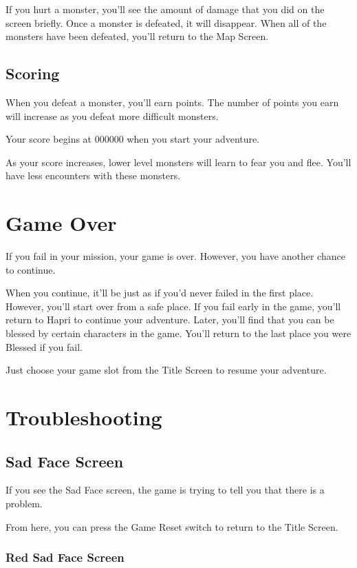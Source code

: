 \documentclass[10pt,twoside,openright]{memoir}
\begin{document}
If you hurt a monster, you'll see the amount of damage that you did on
the   screen  briefly.   Once   a  monster   is   defeated,  it   will
disappear. When all of the  monsters have been defeated, you'll return
to the Map Screen.

\section{Scoring}

When you  defeat a monster, you'll  earn points. The number  of points
you earn will increase as you defeat more difficult monsters.

Your score begins at 000000 when you start your adventure.

As your score  increases, lower level monsters will learn  to fear you
and flee. You'll have less encounters with these monsters.

\chapter{Game Over}

If you fail in your mission, your game is over. However, you have
another chance to continue.

When you continue, it'll be just as if you'd never failed in the first
place. However, you'll start over from a safe place. If you fail early
in the game, you'll return to Hapri to continue your adventure. Later,
you'll find that you can be blessed by certain characters in the
game. You'll return to the last place you were Blessed if you fail.

Just choose your game slot from the Title Screen to resume your
adventure.

\chapter{Troubleshooting}

\section{Sad Face Screen}

If you see the Sad Face screen, the game is trying to tell you that
there is a problem.

From here, you can press the Game Reset switch to return to the Title
Screen. 

\subsection{Red Sad Face Screen}
\end{document}
